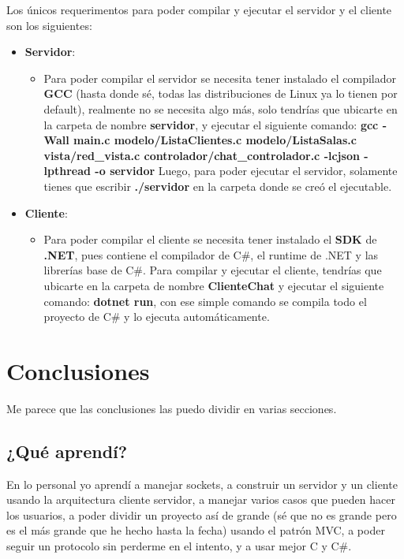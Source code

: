 \documentclass{article}
\begin{document}
Los únicos requerimentos para poder compilar y ejecutar el servidor y el cliente son los siguientes:
\begin{itemize}
    \item \textbf{Servidor}:
    \begin{itemize}
        \item Para poder compilar el servidor se necesita tener instalado el compilador \textbf{GCC} (hasta donde sé, todas las
        distribuciones de Linux ya lo tienen por default), realmente no se necesita algo más, solo tendrías que ubicarte en la carpeta de nombre
        \textbf{servidor}, y ejecutar el siguiente comando: \textbf{gcc -Wall main.c modelo/ListaClientes.c modelo/ListaSalas.c vista/red\_vista.c
        controlador/chat\_controlador.c -lcjson -lpthread -o servidor}
        Luego, para poder ejecutar el servidor, solamente tienes que escribir \textbf{./servidor} en la carpeta donde se creó el ejecutable.
    \end{itemize}
    \item \textbf{Cliente}:
    \begin{itemize}
        \item Para poder compilar el cliente se necesita tener instalado el \textbf{SDK} de \textbf{.NET}, pues contiene el compilador de C\#,
        el runtime de .NET y las librerías base de C\#. Para compilar y ejecutar el cliente, tendrías que ubicarte en la carpeta de nombre
        \textbf{ClienteChat} y ejecutar el siguiente comando: \textbf{dotnet run}, con ese simple comando se compila todo el proyecto de C\#
        y lo ejecuta automáticamente.
    \end{itemize}
\end{itemize}

\clearpage

\section{Conclusiones}
Me parece que las conclusiones las puedo dividir en varias secciones.

\subsection{¿Qué aprendí?}
En lo personal yo aprendí a manejar sockets, a construir un servidor y un cliente usando la arquitectura cliente servidor, a manejar varios casos
que pueden hacer los usuarios, a poder dividir un proyecto así de grande (sé que no es grande pero es el más grande que he hecho hasta la fecha)
usando el patrón MVC, a poder seguir un protocolo sin perderme en el intento, y a usar mejor C y C\#.
\end{document}
